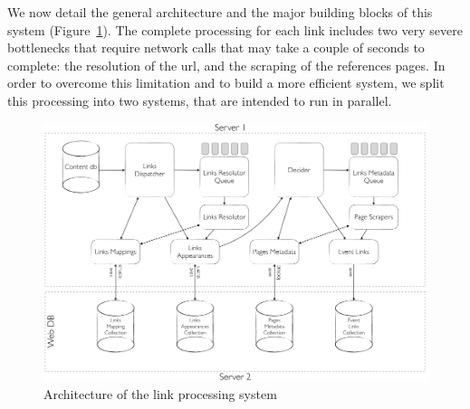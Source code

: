 \documentclass{sig-alternate}
\begin{document}
We now detail the general architecture and the major building blocks of this system (Figure~\ref{fig:architecture}). The complete processing for each link includes two very severe bottlenecks that require network calls that may take a couple of seconds to complete: the resolution of the url, and the scraping of the references pages. In order to overcome this limitation and to build a more efficient system, we split this processing into two systems, that are intended to run in parallel.

\begin{figure}[htbp]
  \centering
  \includegraphics[width=\columnwidth]{Figures/links_processing_architecture.png}
  \caption{Architecture of the link processing system}
  \label{fig:architecture}
\end{figure}
\end{document}

